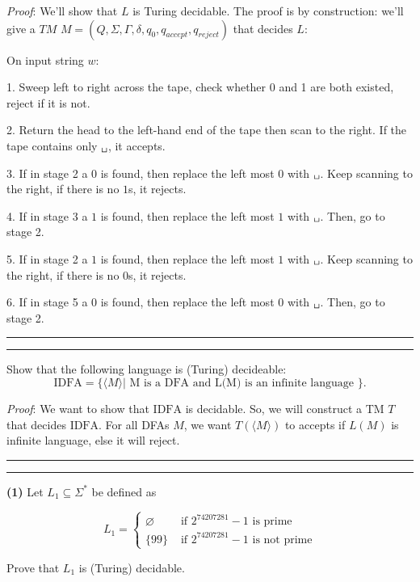\documentclass[a4paper, 11pt]{article}
\newcommand{\question}[2] {\vspace{.25in} \hrule\vspace{0.5em}
	\noindent{\bf #1: #2} \vspace{0.5em}
	\hrule \vspace{.10in}}
\renewcommand{\part}[1] {\vspace{.10in} {\bf (#1)}}
\begin{document}
	{\em Proof}: %
	We’ll show that $L$ is Turing decidable. The proof is by construction: we’ll give a $TM$ $M = (Q, \Sigma, \Gamma, \delta, q_0 , q_{accept} , q_{reject})$ that decides $L$:
	
	On input string $w$:
	
	1. Sweep left to right across the tape, check whether 0 and 1 are both existed, reject if it is not.
	
	2. Return the head to the left-hand end of the tape then scan to the right. If the tape contains only $\texttt{\char32}$, it accepts.
	
	3. If in stage 2 a $0$ is found, then replace the left most $0$ with $\texttt{\char32}$. Keep scanning to the right, if there is no $1$s, it rejects.
	
	4. If in stage 3 a $1$ is found, then replace the left most $1$ with $\texttt{\char32}$. Then, go to stage 2.
	
	5. If in stage 2 a $1$ is found, then replace the left most $1$ with $\texttt{\char32}$. Keep scanning to the right, if there is no $0$s, it rejects.
	
	6. If in stage 5 a $0$ is found, then replace the left most $0$ with $\texttt{\char32}$. Then, go to stage 2.
	
	\question{5}{Infinite DFA}
	
	Show that the following language is (Turing) decideable:
	$$ \text{IDFA} = \{\langle M \rangle| \text{ M is a DFA and L(M) is an infinite language  } \}.$$
	
	{\em Proof}: We want to show that $\text{IDFA}$ is decidable. So, we will construct a TM $T$ that decides $\text{IDFA}$. For all DFAs $M$, we want $T(\langle M \rangle)$ to accepts if $L(M)$ is infinite language, else it will reject. %
	
	\question{6}{Lucky 9}
	
	\part{1} Let $L_1 \subseteq \Sigma^*$ be defined as
	
	$$
	L_1 = \begin{cases} 
	\varnothing & \text{ if $2^{74207281}-1$ is prime} \\
	\{99\} & \text{ if $2^{74207281}-1$ is not prime}
	\end{cases}
	$$
	
	Prove that $L_1$ is (Turing) decidable.
	
\end{document}
